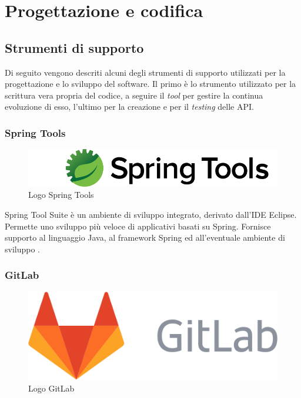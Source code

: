 \chapter{Progettazione e codifica}
\label{chap:progettazione}

\section{Strumenti di supporto}
Di seguito vengono descriti alcuni degli strumenti di supporto utilizzati per la progettazione e lo sviluppo del software. Il primo è lo strumento utilizzato per la scrittura vera propria del codice, a seguire il \textit{tool} per gestire la continua evoluzione di esso, l'ultimo per la creazione e per il \textit{testing} delle \gls{API}.

\subsection{Spring Tools}

\begin{figure}
\begin{center}
\includegraphics[width=0.7\columnwidth]{images/springtoollogo2.png}
\end{center}
\caption{Logo Spring Tools}
\label{fig:stslogo}
\end{figure}

Spring Tool Suite è un ambiente di sviluppo integrato, derivato dall'\gls{IDE} Eclipse. Permette uno sviluppo più veloce di applicativi basati su Spring. Fornisce supporto al linguaggio Java, al \gls{framework} Spring ed all'eventuale ambiente di sviluppo \cite{springtool}. 






\subsection{GitLab}
\begin{figure}
\begin{center}
\includegraphics[width=0.4\columnwidth]{images/GitLab_logo.png}
\end{center}
\caption{Logo GitLab}
\label{fig:gitlab}
\end{figure}


